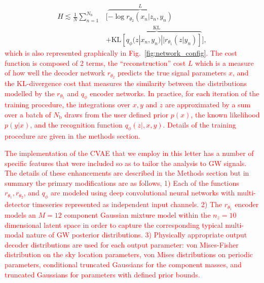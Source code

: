 \documentclass[%
showpacs,
nofootinbib,
 amsmath,amssymb,
 aps,
 twocolumn,
 prl,
 reprint,
floatfix,
]{revtex4-1}
\newcommand{\new}[1]{\textcolor{red}{#1}}
\begin{document}
%
\begin{align}\label{eq:cost3} H \lesssim
\frac{1}{N}\sum_{n=1}^{N_{\text{b}}}&\Big[\overbrace{-\log
r_{\theta_{2}}(x_{n}|z_{n},y_{n})}^{L}\nonumber\\
&+\overbrace{\text{KL}\left[q_{\phi}(z|x_{n},y_{n})||r_{\theta_{1}}(z|y_{n})\right]}^{\text{KL}}\Big],
\end{align}
%
\new{which is also represented graphically in Fig.~\ref{fig:network_config}.
The cost function is composed of 2 terms, the ``reconstruction'' cost $L$ which
is a measure of how well the decoder network $r_{\theta_2}$ predicts the true
signal parameters $x$, and the \ac{KL}-divergence cost that measures the
similarity between the distributions modelled by the $r_{\theta_1}$ and
$q_{\phi}$ encoder networks. In practice, for each iteration of the training
procedure, the integrations over $x,y$ and $z$ are approximated by a sum over a
batch of $N_{\text{b}}$ draws from the user defined prior $p(x)$, the known
likelihood $p(y|x)$, and the recognition function $q_{\phi}(z|,x,y)$. Details
of the training procedure are given in the methods section.}  

%
%
\new{The implementation of the \ac{CVAE} that we employ in this letter has a
number of specific features that were included so as to tailor the analysis to
\ac{GW} signals. The details of these enhancements are described in the Methods
section but in summary the primary modifications are as follows, 1) Each of the
functions $r_{\theta_1},r_{\theta_2}$, and $q_{\phi}$ are modeled using deep
convolutional neural networks with multi-detector timeseries represented as
independent input channels. 2) The $r_{\theta_1}$ encoder models an $M=12$ component
Gaussian mixture model within the $n_{z}=10$ dimensional latent space in order
to capture the corresponding typical multi-modal nature of \ac{GW} posterior
distributions. 3) Physically appropriate output decoder distributions are used
for each output parameter: von Mises-Fisher distribution on the sky location
parameters, von Mises distributions on periodic parameters, conditional
truncated Gaussians for the component masses, and truncated Gaussians for
parameters with defined prior bounds.}  
\end{document}

